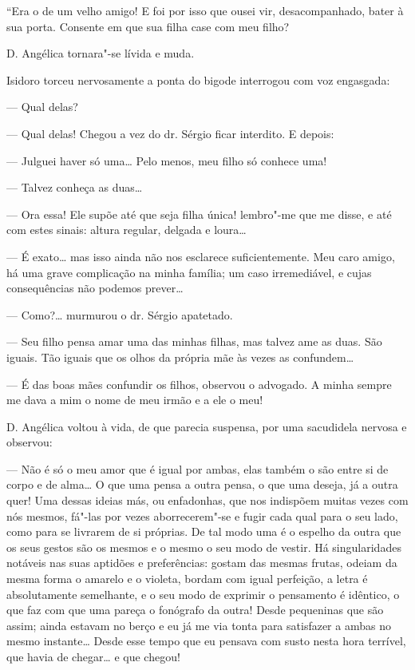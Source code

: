 ``Era o de um velho amigo! E foi por isso que ousei vir, desacompanhado,
bater à sua porta. Consente em que sua filha case com meu filho?

D. Angélica tornara"-se lívida e muda.

Isidoro torceu nervosamente a ponta do bigode interrogou com voz
engasgada:

--- Qual delas?

--- Qual delas! Chegou a vez do dr. Sérgio ficar interdito. E depois:

--- Julguei haver só uma\ldots{} Pelo menos, meu filho só conhece uma!

--- Talvez conheça as duas\ldots{}

--- Ora essa! Ele supõe até que seja filha única! lembro"-me que me
disse, e até com estes sinais: altura regular, delgada e loura\ldots{}

--- É exato\ldots{} mas isso ainda não nos esclarece suficientemente. Meu
caro amigo, há uma grave complicação na minha família; um caso
irremediável, e cujas consequências não podemos prever\ldots{}

--- Como?\ldots{} murmurou o dr. Sérgio apatetado.

--- Seu filho pensa amar uma das minhas filhas, mas talvez ame as duas.
São iguais. Tão iguais que os olhos da própria mãe às vezes as
confundem\ldots{}

--- É das boas mães confundir os filhos, observou o advogado. A minha
sempre me dava a mim o nome de meu irmão e a ele o meu!

D. Angélica voltou à vida, de que parecia suspensa, por uma sacudidela
nervosa e observou:

--- Não é só o meu amor que é igual por ambas, elas também o são entre
si de corpo e de alma\ldots{} O que uma pensa a outra pensa, o que uma
deseja, já a outra quer! Uma dessas ideias más, ou enfadonhas, que nos
indispõem muitas vezes com nós mesmos, fá"-las por vezes aborrecerem"-se e
fugir cada qual para o seu lado, como para se livrarem de si próprias.
De tal modo uma é o espelho da outra que os seus gestos são os mesmos e
o mesmo o seu modo de vestir. Há singularidades notáveis nas suas
aptidões e preferências: gostam das mesmas frutas, odeiam da mesma forma
o amarelo e o violeta, bordam com igual perfeição, a letra é
absolutamente semelhante, e o seu modo de exprimir o pensamento é
idêntico, o que faz com que uma pareça o fonógrafo da outra! Desde
pequeninas que são assim; ainda estavam no berço e eu já me via tonta
para satisfazer a ambas no mesmo instante\ldots{} Desde esse tempo que eu
pensava com susto nesta hora terrível, que havia de chegar\ldots{} e que
chegou!

